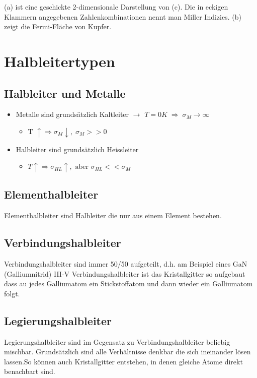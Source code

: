 (a) ist eine geschickte 2-dimensionale Darstellung von (c). Die in eckigen Klammern angegebenen Zahlenkombinationen nennt man Miller Indizies. (b) zeigt die Fermi-Fläche von Kupfer.

\section{Halbleitertypen}
	\subsection{Halbleiter und Metalle}
	\begin{itemize}
		\item Metalle sind grundsätzlich Kaltleiter $\rightarrow$ $T=0K \; \Rightarrow \; \sigma_M \rightarrow \infty$
		\begin{itemize}
			\item T $\uparrow \Rightarrow \sigma_M \downarrow, \; \sigma_M >>0$
		\end{itemize}
		\item Halbleiter sind grundsätzlich Heissleiter
		\begin{itemize}
			\item $T\uparrow \Rightarrow \sigma_{HL} \uparrow, \text{ aber } \sigma_{HL} << \sigma_M$
		\end{itemize}
	\end{itemize}
	
	\subsection{Elementhalbleiter} \label{ss_hltyp_ehl}
	Elementhalbleiter sind Halbleiter die nur aus einem Element bestehen.
	\subsection{Verbindungshalbleiter} \label{ss_hltyp_vhl}
	Verbindungshalbleiter sind immer 50/50 aufgeteilt, d.h. am Beispiel eines GaN (Galliumnitrid) III-V Verbindungshalbleiter ist das Kristallgitter so aufgebaut dass au jedes Galliumatom ein Stickstoffatom und dann wieder ein Galliumatom folgt. 
	\subsection{Legierungshalbleiter} \label{ss_hltyp_lhl}
	Legierungshalbleiter sind im Gegensatz zu Verbindungshalbleiter beliebig mischbar. Grundsätzlich sind alle Verhältnisse denkbar die sich ineinander lösen lassen.So können auch Kristallgitter entstehen, in denen gleiche Atome direkt benachbart sind.
	
